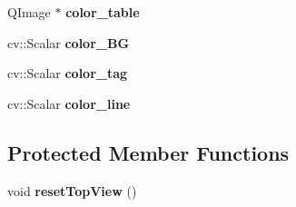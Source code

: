 \begin{DoxyCompactItemize}
\item 
\hypertarget{class_top_view_a6a41c281c60a67bdceca7a33abe805a5}{}Q\+Image $\ast$ {\bfseries color\+\_\+table}\label{class_top_view_a6a41c281c60a67bdceca7a33abe805a5}

\item 
\hypertarget{class_top_view_a08bac944fb14eb668817d322a1956f3b}{}cv\+::\+Scalar {\bfseries color\+\_\+\+B\+G}\label{class_top_view_a08bac944fb14eb668817d322a1956f3b}

\item 
\hypertarget{class_top_view_ac0094dc43998e987ff269e93263f6983}{}cv\+::\+Scalar {\bfseries color\+\_\+tag}\label{class_top_view_ac0094dc43998e987ff269e93263f6983}

\item 
\hypertarget{class_top_view_a1eac41f96e88d30801e1b813ac97a111}{}cv\+::\+Scalar {\bfseries color\+\_\+line}\label{class_top_view_a1eac41f96e88d30801e1b813ac97a111}

\end{DoxyCompactItemize}
\subsection*{Protected Member Functions}
\begin{DoxyCompactItemize}
\item 
\hypertarget{class_top_view_a13003b4bba4ddbf745ee7b9611e70cdb}{}void {\bfseries reset\+Top\+View} ()\label{class_top_view_a13003b4bba4ddbf745ee7b9611e70cdb}

\end{DoxyCompactItemize}
